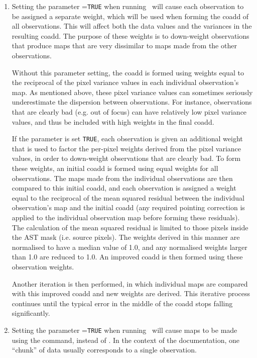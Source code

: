 \begin{enumerate}
\item Setting the parameter =\texttt{TRUE} when running
\poltwomap\ will cause each observation to be assigned a separate
weight, which will be used when forming the coadd of all observations.
This will affect both the data values and the variances in the resulting
coadd. The purpose of these weights is to down-weight observations that
produce maps that are very dissimilar to maps made from the other observations.

Without this parameter setting, the coadd is formed using weights equal
to the reciprocal of the pixel variance values in each individual
observation's map. As mentioned above, these pixel variance values can
sometimes seriously underestimate the dispersion between observations.
For instance, observations that are clearly bad (e.g. out of focus) can have
relatively low pixel variance values, and thus be included with high weights
in the final coadd.

If the  parameter is set \texttt{TRUE}, each observation
is given an additional weight that is used to factor the per-pixel
weights derived from the pixel variance values, in order to down-weight
observations that are clearly bad. To form these weights, an initial
coadd is formed using equal weights for all observations. The maps made
from the individual observations are then compared to this initial coadd,
and each observation is assigned a weight equal to the reciprocal of the
mean squared residual between the individual observation's map and the
initial coadd (any required pointing correction is applied to the
individual observation map before forming these residuals). The
calculation of the mean squared residual is limited to those pixels
inside the AST mask (i.e. source pixels). The weights derived in this
manner are normalised to have a median value of 1.0, and any normalised
weights larger than 1.0 are reduced to 1.0. An improved coadd is then
formed using these observation weights.

Another iteration is then performed, in which individual maps are compared
with this improved coadd and new weights are derived. This iterative
process continues until the typical error in the middle of the coadd
stops falling significantly.

\item  Setting the parameter =\texttt{TRUE} when running
\poltwomap\ will cause maps to be made using the
 command, instead of
. In the context of the  documentation, one
``chunk'' of data usually corresponds to a single observation.


\end{enumerate}
